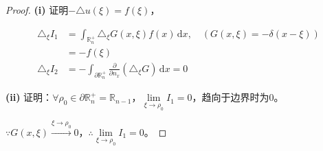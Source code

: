 \documentclass[11pt, a4paper]{article}
\theoremstyle{theorem}
\newcommand{\intd}[1]{\,\mathrm{d}{#1}}
\begin{document}
\begin{proof}

\textbf{(i)} 证明$- \triangle u(\xi) = f(\xi)$，

\begin{align*}
\triangle_\xi I_1 &= \int_{\mathbb{R}_n^+} \triangle_\xi G(x,\xi) f(x) \intd x, \quad (G(x,\xi) = - \delta(x - \xi)) \\
&= - f(\xi) \\
\triangle_\xi I_2 &= - \int_{\partial \mathbb{R}_n^+} \frac{\partial }{\partial n_x} (\triangle_\xi G) \intd x = 0
\end{align*}

\textbf{(ii)} 证明：$\forall \rho_0 \in \partial \mathbb{R}_n^+ = \mathbb{R}_{n-1}$，$\lim\limits_{\xi \rightarrow \rho_0} I_1 = 0$，趋向于边界时为0。

$\because G(x,\xi) \xrightarrow{\xi \rightarrow \rho_0} 0$，$\therefore \lim\limits_{\xi \rightarrow \rho_0} I_1 = 0$。


\end{proof}
\end{document}
